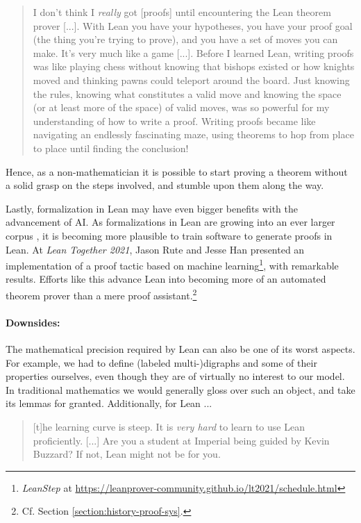 \begin{quote}
I don’t think I \emph{really} got [proofs] until encountering the Lean theorem prover [...].
With Lean you have your hypotheses, you have your proof goal (the thing you’re trying to prove), and you have a set of moves you can make. 
It’s very much like a game [...].
Before I learned Lean, writing proofs was like playing chess without knowing that bishops existed or how knights moved and thinking pawns could teleport around the board. 
Just knowing the rules, knowing what constitutes a valid move and knowing the space (or at least more of the space) of valid moves, was so powerful for my understanding of how to write a proof. 
Writing proofs became like navigating an endlessly fascinating maze, using theorems to hop from place to place until finding the conclusion!\hfill \cite{homework}
\end{quote}

\noindent Hence, as a non-mathematician it is possible to start proving a theorem without a solid grasp on the steps involved, and stumble upon them along the way.

Lastly, formalization in Lean may have even bigger benefits with the advancement of AI.
As formalizations in Lean are growing into an ever larger corpus \cite{stats}, it is becoming more plausible to train software to generate proofs in Lean.
At \emph{Lean Together 2021}, Jason Rute and Jesse Han presented an implementation of a proof tactic based on machine learning\footnote{\emph{LeanStep} at \url{https://leanprover-community.github.io/lt2021/schedule.html}}, with remarkable results.
Efforts like this advance Lean into becoming more of an automated theorem prover than a mere proof assistant.\footnote{Cf. Section \ref{section:history-proof-sys}.}

\paragraph{Downsides:}

The mathematical precision required by Lean can also be one of its worst aspects.
For example, we had to define (labeled multi-)digraphs and some of their properties ourselves, even though they are of virtually no interest to our model.
In traditional mathematics we would generally gloss over such an object, and take its lemmas for granted.
Additionally, for Lean ...

\begin{quote}
[t]he learning curve is steep. 
It is \emph{very hard} to learn to use Lean proficiently. [...]
Are you a student at Imperial being guided by Kevin Buzzard?
If not, Lean might not be for you.\hfill \cite{hales}
\end{quote}

